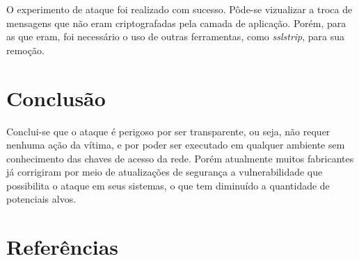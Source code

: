 \documentclass[12pt]{article}
\begin{document}
O experimento de ataque foi realizado com sucesso. Pôde-se vizualizar a troca de mensagens que não eram criptografadas pela camada de aplicação. Porém, para as que eram, foi necessário o uso de outras ferramentas, como \textit{sslstrip}, para sua remoção.

\section{Conclusão}

Conclui-se que o ataque é perigoso por ser transparente, ou seja, não requer nenhuma ação da vítima, e por poder ser executado em qualquer ambiente sem conhecimento das chaves de acesso da rede. Porém atualmente muitos fabricantes já corrigiram por meio de atualizações de segurança a vulnerabilidade que possibilita o ataque em seus sistemas, o que tem diminuído a quantidade de potenciais alvos.

\section{Referências}



\end{document}
